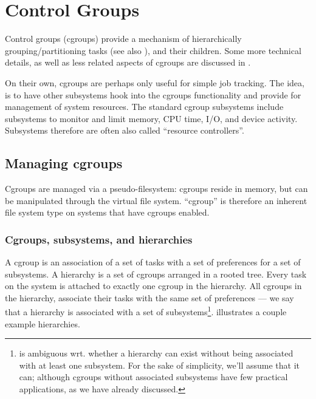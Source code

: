 

\section{Control Groups}

\label{section:sandboxing:control-groups}

Control groups (cgroups) provide a mechanism of hierarchically
grouping/partitioning tasks (see also
), and their
children\cite{cgroups.txt}. Some more technical details, as well as less
related aspects of cgroups are discussed in
.

On their own, cgroups are perhaps only useful for simple job tracking. The
idea, is to have other subsystems hook into the cgroups functionality and
provide for management of system resources. The standard cgroup subsystems
include subsystems to monitor and limit memory, CPU time, I/O, and device
activity. Subsystems therefore are often also called ``resource controllers''.

\subsection{Managing cgroups}

Cgroups are managed via a pseudo-filesystem: cgroups reside in memory, but can
be manipulated through the virtual file system.  ``cgroup'' is therefore an
inherent file system type on systems that have cgroups enabled.

\subsubsection{Cgroups, subsystems, and hierarchies}

A cgroup is an association of a set of tasks with a set of preferences for a
set of subsystems.  A hierarchy is a set of cgroups arranged in a rooted tree.
Every task on the system is attached to exactly one cgroup in the hierarchy.
All cgroups in the hierarchy, associate their tasks with the same set of
preferences --- we say that a hierarchy is associated with a set of
subsystems\footnote{\cite{cgroups.txt} is ambiguous wrt. whether a hierarchy
can exist without being associated with at least one subsystem. For the sake of
simplicity, we'll assume that it can; although cgroups without associated
subsystems have few practical applications, as we have already discussed.}.
 illustrates a couple example hierarchies.

